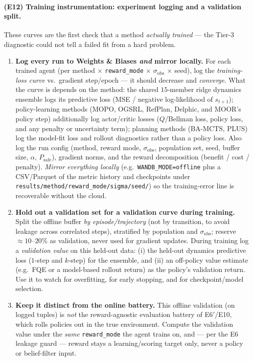 \documentclass[11pt]{article}
\newcommand{\sobs}{\sigma_{\mathrm{obs}}}
\newcommand{\code}[1]{\texttt{#1}}
\begin{document}
\paragraph{(E12) Training instrumentation: experiment logging and a validation split.}
These curves are the first check that a method \emph{actually trained} --- the Tier-3
diagnostic could not tell a failed fit from a hard problem.
\begin{enumerate}[leftmargin=1.8em,nosep]
\item \textbf{Log every run to Weights \& Biases \emph{and} mirror locally.} For each
trained agent (per method $\times$ \code{reward\_mode} $\times$ $\sobs$ $\times$ seed),
log the \emph{training-loss curve} vs.\ gradient step/epoch --- it should decrease and
\emph{converge}. What the curve is depends on the method: the shared $15$-member ridge
dynamics ensemble logs its predictive loss (MSE / negative log-likelihood of
$s_{t+1}$); policy-learning methods (MOPO, OGSRL, RefPlan, Delphic, and MOOR's policy
step) additionally log actor/critic losses ($Q$/Bellman loss, policy loss, and any
penalty or uncertainty term); planning methods (BA-MCTS, PLUS) log the model-fit loss
and rollout diagnostics rather than a policy loss. Also log the run config (method,
reward mode, $\sobs$, population set, seed, buffer size, $\alpha$, $P_{\mathrm{safe}}$),
gradient norms, and the reward decomposition (benefit / cost / penalty). \emph{Mirror
everything locally} (e.g.\ \code{WANDB\_MODE=offline} plus a CSV/Parquet of the metric
history and checkpoints under \code{results/method/reward\_mode/sigma/seed/}) so the
training-error line is recoverable without the cloud.
\item \textbf{Hold out a validation set for a validation curve during training.} Split
the offline buffer \emph{by episode/trajectory} (not by transition, to avoid leakage
across correlated steps), stratified by population and $\sobs$; reserve
$\approx10$--$20\%$ as validation, never used for gradient updates. During training log
a \emph{validation value} on this held-out data: (i) the held-out dynamics predictive
loss ($1$-step and $k$-step) for the ensemble, and (ii) an off-policy value estimate
(e.g.\ FQE or a model-based rollout return) as the policy's validation return. Use it
to watch for overfitting, for early stopping, and for checkpoint/model selection.
\item \textbf{Keep it distinct from the online battery.} This offline validation (on
logged tuples) is \emph{not} the reward-agnostic evaluation battery of E6$'$/E10, which
rolls policies out in the true environment. Compute the validation value under the
\emph{same} \code{reward\_mode} the agent trains on, and --- per the E6 leakage guard
--- reward stays a learning/scoring target only, never a policy or belief-filter input.
\end{enumerate}
\end{document}
